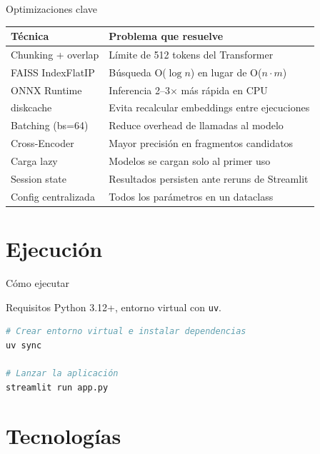\documentclass[aspectratio=169]{beamer}
\begin{document}
\begin{frame}{Optimizaciones clave}
  \begin{center}
    \small
    \begin{tabular}{p{4cm}p{7cm}}
      \textbf{Técnica} & \textbf{Problema que resuelve} \\
      \hline
      Chunking + overlap & Límite de 512 tokens del Transformer \\
      FAISS IndexFlatIP  & Búsqueda O($\log n$) en lugar de O($n\cdot m$) \\
      ONNX Runtime       & Inferencia 2--3$\times$ más rápida en CPU \\
      diskcache          & Evita recalcular embeddings entre ejecuciones \\
      Batching (bs=64)   & Reduce overhead de llamadas al modelo \\
      Cross-Encoder      & Mayor precisión en fragmentos candidatos \\
      Carga lazy         & Modelos se cargan solo al primer uso \\
      Session state      & Resultados persisten ante reruns de Streamlit \\
      Config centralizada & Todos los parámetros en un dataclass \\
    \end{tabular}
  \end{center}
\end{frame}

\section{Ejecución}

\begin{frame}{Cómo ejecutar}
  \begin{block}{Requisitos}
    Python 3.12+, entorno virtual con \texttt{uv}.
  \end{block}
  \vspace{0.5em}
  \begin{lstlisting}[language=bash]
# Crear entorno virtual e instalar dependencias
uv sync

# Lanzar la aplicación
streamlit run app.py
  \end{lstlisting}
\end{frame}

\section{Tecnologías}
\end{document}
